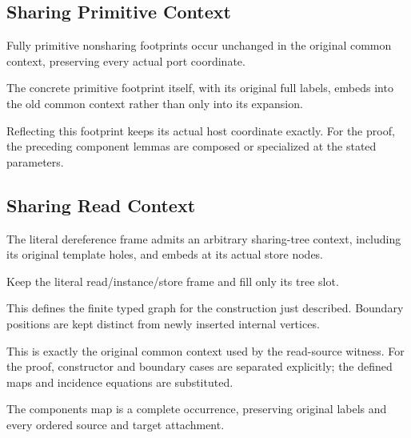 \subsection{Sharing Primitive Context}
Fully primitive nonsharing footprints occur unchanged in the original common context, preserving every actual port coordinate.

The concrete primitive footprint itself, with its original full labels, embeds into the old common context rather than only into its expansion.
\par{}

Reflecting this footprint keeps its actual host coordinate exactly.
For the proof, the preceding component lemmas are composed or specialized at the stated parameters.
\par{}

\subsection{Sharing Read Context}
The literal dereference frame admits an arbitrary sharing-tree context, including its original template holes, and embeds at its actual store nodes.

Keep the literal read/instance/store frame and fill only its tree slot.
\par{}

This defines the finite typed graph for the construction just described. Boundary positions are kept distinct from newly inserted internal vertices.
\par{}

This is exactly the original common context used by the read-source witness.
For the proof, constructor and boundary cases are separated explicitly; the defined maps and incidence equations are substituted.
\par{}

The components map is a complete occurrence, preserving original labels and every ordered source and target attachment.
\par{}

